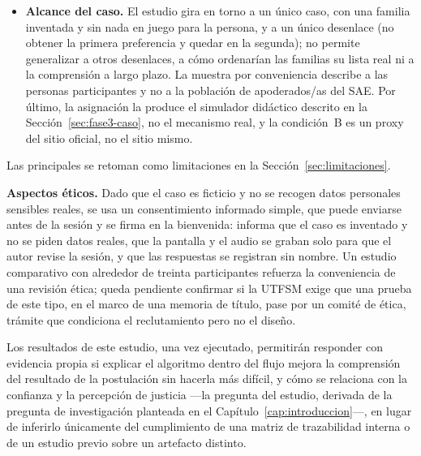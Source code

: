 \begin{itemize}
    \item \textbf{Alcance del caso.} El estudio gira en torno a un único caso, con una familia inventada y sin nada en juego para la persona, y a un único desenlace (no obtener la primera preferencia y quedar en la segunda); no permite generalizar a otros desenlaces, a cómo ordenarían las familias su lista real ni a la comprensión a largo plazo. La muestra por conveniencia describe a las personas participantes y no a la población de apoderados/as del SAE. Por último, la asignación la produce el simulador didáctico descrito en la Sección~\ref{sec:fase3-caso}, no el mecanismo real, y la condición~B es un proxy del sitio oficial, no el sitio mismo.
\end{itemize}
Las principales se retoman como limitaciones en la Sección~\ref{sec:limitaciones}.

\textbf{Aspectos éticos.} Dado que el caso es ficticio y no se recogen datos personales sensibles reales, se usa un consentimiento informado simple, que puede enviarse antes de la sesión y se firma en la bienvenida: informa que el caso es inventado y no se piden datos reales, que la pantalla y el audio se graban solo para que el autor revise la sesión, y que las respuestas se registran sin nombre. Un estudio comparativo con alrededor de treinta participantes refuerza la conveniencia de una revisión ética; queda pendiente confirmar si la UTFSM exige que una prueba de este tipo, en el marco de una memoria de título, pase por un comité de ética, trámite que condiciona el reclutamiento pero no el diseño.

Los resultados de este estudio, una vez ejecutado, permitirán responder con evidencia propia si explicar el algoritmo dentro del flujo mejora la comprensión del resultado de la postulación sin hacerla más difícil, y cómo se relaciona con la confianza y la percepción de justicia ---la pregunta del estudio, derivada de la pregunta de investigación planteada en el Capítulo~\ref{cap:introduccion}---, en lugar de inferirlo únicamente del cumplimiento de una matriz de trazabilidad interna o de un estudio previo sobre un artefacto distinto.
